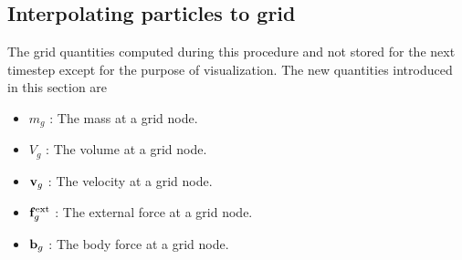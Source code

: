 \subsection{Interpolating particles to grid}
The grid quantities computed during this procedure and not stored for the next timestep except for
the purpose of visualization.  The new quantities introduced in this section are
\begin{itemize} 
  \setlength\itemsep{1pt}
  \item $m_g$ : {\Ochre The mass at a grid node.}
  \item $V_g$ : {\Ochre The volume at a grid node.}
  \item $\mathbf{v}_g$ : {\Ochre The velocity at a grid node.}
  \item $\mathbf{f}^{\text{ext}}_g$ : {\Ochre The external force at a grid node.}
  \item $\mathbf{b}_g$ : {\Ochre The body force at a grid node.}
\end{itemize}
